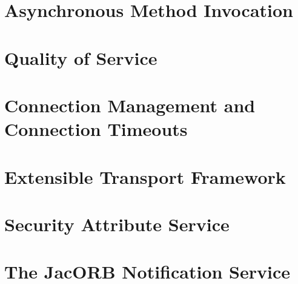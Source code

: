 \documentclass[12pt]{scrbook}
\begin{document}
\chapter{Asynchronous Method Invocation}
\label{ch:AMI}




\chapter{Quality of Service}
\label{ch:qos}




\chapter{Connection Management and Connection Timeouts}
\label{ch:connections}




\chapter{Extensible Transport Framework}
\label{ch:etf}




\chapter{Security Attribute Service}
\label{ch:sas}




\chapter{The JacORB Notification Service}
\label{ch:ntfy}



\end{document}
